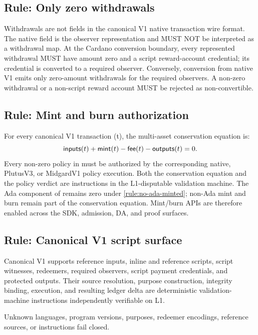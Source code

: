 \documentclass[../midgard.tex]{subfiles}
\begin{document}
\subsection{Rule: Only zero withdrawals}

Withdrawals are not fields in the canonical V1 native transaction wire format.
The native  field is the observer representation and
MUST NOT be interpreted as a withdrawal map.  At the Cardano conversion
boundary, every represented withdrawal MUST have amount zero and a script
reward-account credential; its credential is converted to a required observer.
Conversely, conversion from native V1 emits only zero-amount withdrawals for
the required observers.  A non-zero withdrawal or a non-script reward account
MUST be rejected as non-convertible.

\subsection{Rule: Mint and burn authorization}

For every canonical V1 transaction (t), the multi-asset conservation equation is:
\begin{equation*}
    \mathsf{inputs}(t) + \mathsf{mint}(t) -
    \mathsf{fee}(t) - \mathsf{outputs}(t) = 0.
\end{equation*}
Every non-zero policy in  must be authorized by the corresponding
native, PlutusV3, or MidgardV1 policy execution. Both the conservation equation
and the policy verdict are instructions in the L1-disputable validation
machine. The Ada component of  remains zero under
\cref{rule:no-ada-minted}; non-Ada mint and burn remain part of the
conservation equation. Mint/burn APIs are therefore enabled across the SDK,
admission, DA, and proof surfaces.

\subsection{Rule: Canonical V1 script surface}

Canonical V1 supports reference inputs, inline and reference scripts, script
witnesses, redeemers, required observers, script payment credentials, and
protected outputs. Their source resolution, purpose construction, integrity
binding, execution, and resulting ledger delta are deterministic
validation-machine instructions independently verifiable on L1.

Unknown languages, program versions, purposes, redeemer encodings, reference
sources, or instructions fail closed.
\end{document}
